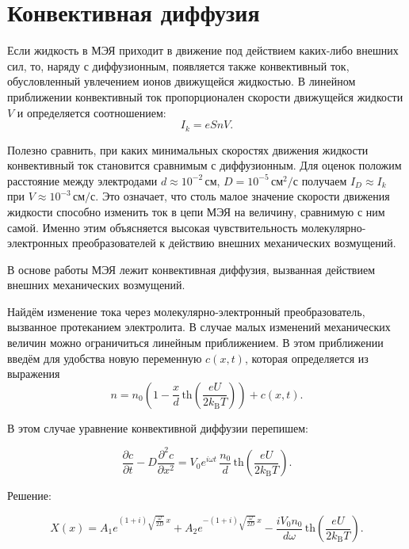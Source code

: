 \documentclass[12pt, a4paper]{article}
\begin{document}
\section*{Конвективная диффузия}

Если жидкость в МЭЯ приходит в движение под действием каких-либо внешних сил, то, наряду с диффузионным, появляется также конвективный ток, обусловленный увлечением ионов движущейся жидкостью. В линейном приближении конвективный ток пропорционален скорости движущейся жидкости $V$ и определяется соотношением:
\begin{equation}
I_k = e S n V.
\label{eq:convective_current}
\end{equation}

Полезно сравнить, при каких минимальных скоростях движения жидкости конвективный ток становится сравнимым с диффузионным. Для оценок положим расстояние между электродами $d \approx 10^{-2}\,\text{см}$, $D = 10^{-5}\,\text{см$^2$/с}$ получаем $I_D \approx I_k$ при $V \approx 10^{-3}\,\text{см/с}$. Это означает, что столь малое значение скорости движения жидкости способно изменить ток в цепи МЭЯ на величину, сравнимую с ним самой. Именно этим объясняется высокая чувствительность молекулярно-электронных преобразователей к действию внешних механических возмущений.

В основе работы МЭЯ лежит конвективная диффузия, вызванная действием внешних механических возмущений. 

Найдём изменение тока через молекулярно-электронный преобразователь, вызванное протеканием электролита. В случае малых изменений механических величин можно ограничиться линейным приближением. В этом приближении введём для удобства новую переменную $c(x,t)$, которая определяется из выражения
\begin{equation}
n = n_0 \left( 1 - \frac{x}{d} \, \mathrm{th}\!\left( \frac{eU}{2k_\mathrm{B}T} \right) \right) + c(x,t).
\label{eq:carrier_concentration_perturbation}
\end{equation}

В этом случае уравнение конвективной диффузии перепишем:

\begin{equation}
\frac{\partial c}{\partial t} - D \frac{\partial^2 c}{\partial x^2} = V_0 e^{i\omega t} \, \frac{n_0}{d} \, \mathrm{th}\!\left( \frac{eU}{2k_\mathrm{B}T} \right).
\label{eq:diffusion_perturbation_equation}
\end{equation}

Решение:

\begin{equation}
X(x) = A_1 e^{(1+i)\sqrt{\frac{\omega}{2D}}\,x} + A_2 e^{-(1+i)\sqrt{\frac{\omega}{2D}}\,x} - \frac{i V_0 n_0}{d \omega} \, \mathrm{th}\!\left( \frac{eU}{2k_\mathrm{B}T} \right).
\label{eq:solution_X_x}
\end{equation}
\end{document}
